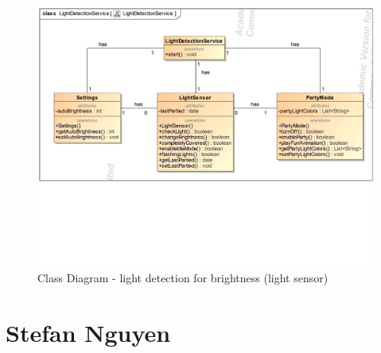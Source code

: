 \documentclass{article}
\begin{document}
		\clearpage
		\begin{figure}[h!]
			\centering
			\captionsetup{labelformat=empty}
			\caption{Class Diagram - light detection for brightness (light sensor)}
		    	\includegraphics[width=\textwidth, angle=0]{Marc/light/LightDetectionServiceClass.pdf}
		\end{figure}
		\clearpage	

\section{Stefan Nguyen}
\end{document}
